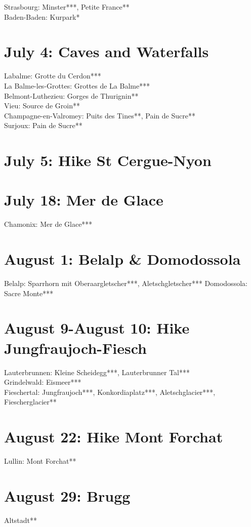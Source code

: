 Strasbourg: Minster***, Petite France**\\
Baden-Baden: Kurpark*\\

 \section{July 4: Caves and Waterfalls}
\label{2020:CavesWaterfalls}

Labalme: Grotte du Cerdon***\\
La Balme-les-Grottes: Grottes de La Balme***\\
Belmont-Luthezieu: Gorges de Thurignin**\\
Vieu: Source de Groin**\\
Champagne-en-Valromey: Puits des Tines**, Pain de Sucre**\\
Surjoux: Pain de Sucre**\\


 \section{July 5: Hike St Cergue-Nyon}
\label{2020:StCergue}

 \section{July 18: Mer de Glace}
\label{2020:Mer de Glace}

Chamonix: Mer de Glace***

\section{August 1: Belalp \& Domodossola}
\label{2020:BelalpDomodossola}

Belalp: Sparrhorn mit Oberaargletscher***, Aletschgletscher***
Domodossola: Sacre Monte***

\section{August 9-August 10: Hike Jungfraujoch-Fiesch}
\label{2020:Aletsch}

Lauterbrunnen: Kleine Scheidegg***, Lauterbrunner Tal***\\
Grindelwald: Eismeer***\\
Fieschertal: Jungfraujoch***, Konkordiaplatz***, Aletschglacier***, Fiescherglacier**\\

\section{August 22: Hike Mont Forchat}
\label{2020:Forchat}

Lullin: Mont Forchat**

\section{August 29: Brugg}
\label{2020:Brugg}

Altstadt**
